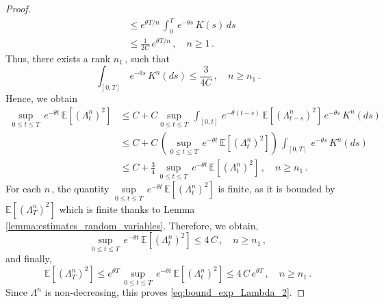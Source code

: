 \documentclass{article}
\newcommand{\1}{\mathbbm{1}}
\numberwithin{equation}{section}
\begin{document}
\begin{proof}
\begin{align*}
        &\leq e^{\theta T / n}\, \int_0^T\,e^{- \theta s}\,K(s)\,ds\\
        & \leq \frac{1}{2C}\,e^{\theta T / n}\,, \quad n \geq 1\,.
    \end{align*}
    Thus, there exists a rank $n_1\,$, such that
    $$
    \int_{[0,T]}\,e^{- \theta s}\,K^n(ds) \leq \frac{3}{4C}\,, \quad n \geq n_1\,.
    $$
    Hence, we obtain
    \begin{align*}
        \sup_{0 \leq t \leq T}\, e^{- \theta t}\, \mathbb E \left[\left(\Lambda^n_t\right)^2 \right] &\leq C + C \sup_{0 \leq t \leq T}\, \int_{[0,t]}\,e^{- \theta(t-s)}\, \mathbb E \left[\left(\Lambda^n_{t-s}\right)^2\right]\,e^{- \theta s}\,K^n(ds) \\
        &\leq C + C\,\left(\sup_{0 \leq t \leq T}\,e^{- \theta t}\, \mathbb E \left[\left(\Lambda^n_{t} \right)^2\right] \right)\,\int_{[0,T]}\,e^{- \theta s}\,K^n(ds) \\
        &\leq C + \frac{3}{4}\, \sup_{0 \leq t \leq T}\,e^{- \theta t}\, \mathbb E \left[\left(\Lambda^n_{t} \right)^2\right]\,, \quad n \geq n_1\,.
    \end{align*}
    For each $n\,$, the quantity $\sup\limits_{0 \leq t \leq T}\,e^{- \theta t}\, \mathbb E \left[ \left(\Lambda^n_t\right)^2\right]$ is finite, as it is bounded by $\mathbb E \left[\left(\Lambda^n_T \right)^2 \right]$ which is finite thanks to Lemma \ref{lemma:estimates_random_variables}. Therefore, we obtain,
    $$
    \sup_{0 \leq t \leq T}\,e^{- \theta t}\,\mathbb E \left[\left(\Lambda^n_t \right)^2\right] \leq 4\,C\,, \quad n \geq n_1\,,
    $$
    and finally,
    $$
    \mathbb E \left[(\Lambda^n_T)^2 \right] \leq e^{\theta T}\,\sup_{0 \leq t \leq T}\,e^{-\theta t}\, \mathbb E \left[ \left(\Lambda^n_t\right)^2\right] \leq 4\,C\,e^{\theta T}\,, \quad n \geq n_1\,.
    $$
    Since $\Lambda^n$ is non-decreasing, this proves \eqref{eq:bound_exp_Lambda_2}.
    
    
    


\end{proof}
\end{document}
